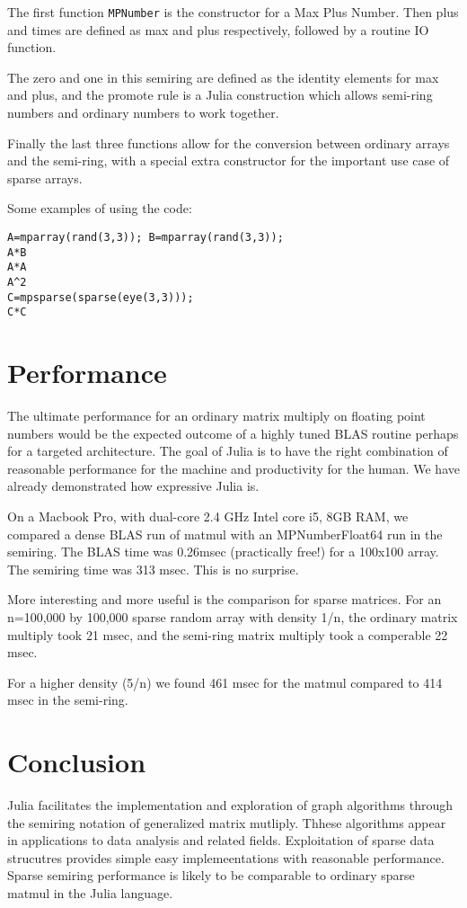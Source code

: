 \documentclass[conference]{IEEEtran}
\begin{document}
The first function \verb+MPNumber+ is the constructor for a Max Plus Number.
Then plus and times are defined as max and plus respectively, followed by 
a routine IO function.

The zero and one in this semiring are defined as the identity elements for max and plus,
and the promote rule is a Julia construction which allows semi-ring numbers and ordinary
numbers to work together.

Finally the last three functions allow for the conversion between ordinary arrays and the semi-ring, with a special extra constructor for the important use case of sparse arrays.

Some examples of using the code:


\begin{verbatim}
A=mparray(rand(3,3)); B=mparray(rand(3,3));
A*B
A*A
A^2
C=mpsparse(sparse(eye(3,3)));
C*C
\end{verbatim}





\section{Performance}

The ultimate performance for an ordinary matrix multiply on floating point numbers 
would be the expected outcome of a highly tuned BLAS routine perhaps for a targeted
architecture.  The goal of Julia is to have the right combination of reasonable performance
for the machine and productivity for the human.  We have already demonstrated how expressive
Julia is.

On a Macbook Pro, with dual-core 2.4 GHz Intel core i5, 8GB RAM, we compared a dense BLAS run of matmul with an MPNumber{Float64} run in the semiring.
The BLAS time was 0.26msec (practically free!) for a 100x100 array.  The semiring time
was 313 msec.  This is no surprise.

More interesting and more useful is the comparison for sparse matrices.  For an n=100,000 by 100,000 sparse random array with density 1/n, the ordinary matrix multiply took 21 msec, and the semi-ring matrix multiply took a comperable
22 msec.

For a higher density (5/n) we found 461 msec for the matmul compared to 414 msec in the semi-ring.




\section{Conclusion}

Julia facilitates the implementation and exploration of graph algorithms through
the semiring notation of generalized matrix mutliply.  Thhese algorithms appear
in applications to data analysis and related fields.  Exploitation of sparse data 
strucutres provides simple easy implemeentations with reasonable performance.
Sparse semiring performance is likely to be comparable to ordinary sparse matmul in the Julia
language.




\end{document}
